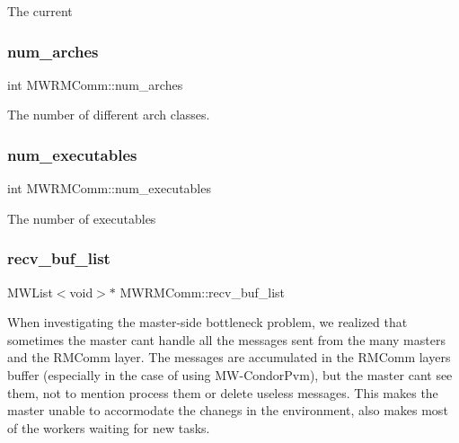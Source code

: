 The current \mbox{\label{classMWRMComm_a34760512eb56356d6581e18475f77050}} 
\subsubsection{\texorpdfstring{num\+\_\+arches}{num\_arches}}
{\footnotesize\ttfamily int M\+W\+R\+M\+Comm\+::num\+\_\+arches\hspace{0.3cm}{\ttfamily [protected]}}

The number of different arch classes. \mbox{\label{classMWRMComm_acf783eaa2bac49d0cca1b403725d8f66}} 
\subsubsection{\texorpdfstring{num\+\_\+executables}{num\_executables}}
{\footnotesize\ttfamily int M\+W\+R\+M\+Comm\+::num\+\_\+executables\hspace{0.3cm}{\ttfamily [protected]}}

The number of executables \mbox{\label{classMWRMComm_ac0edce61ba0263a04a569df694397fe1}} 
\subsubsection{\texorpdfstring{recv\+\_\+buf\+\_\+list}{recv\_buf\_list}}
{\footnotesize\ttfamily M\+W\+List$<$void$>$$\ast$ M\+W\+R\+M\+Comm\+::recv\+\_\+buf\+\_\+list\hspace{0.3cm}{\ttfamily [protected]}}

When investigating the master-\/side bottleneck problem, we realized that sometimes the master can\textquotesingle{}t handle all the messages sent from the many masters and the R\+M\+Comm layer. The messages are accumulated in the R\+M\+Comm layer\textquotesingle{}s buffer (especially in the case of using M\+W-\/\+Condor\+Pvm), but the master can\textquotesingle{}t see them, not to mention process them or delete useless messages. This makes the master unable to accormodate the chanegs in the environment, also makes most of the workers waiting for new tasks.

